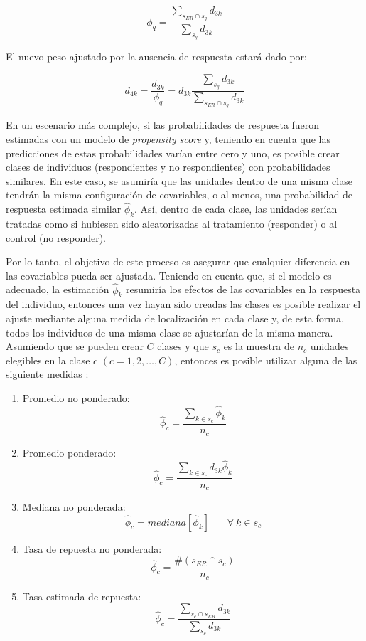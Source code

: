 \documentclass[
  12pt,
  spanish,
]{book}
\begin{document}
\[
\phi_{q} = \frac{\sum_{s_{ER}\cap s_q}d_{3k}}{\sum_{s_{q}}d_{3k}}
\]

El nuevo peso ajustado por la ausencia de respuesta estará dado por:

\[
d_{4k} = \frac{d_{3k}}{\phi_{q}} 
= d_{3k}\frac{\sum_{s_q}d_{3k}}{\sum_{s_{ER}\cap s_q}d_{3k}}
\]

En un escenario más complejo, si las probabilidades de respuesta fueron estimadas con un modelo de \emph{propensity score} y, teniendo en cuenta que las predicciones de estas probabilidades varían entre cero y uno, es posible crear clases de individuos (respondientes y no respondientes) con probabilidades similares. En este caso, se asumiría que las unidades dentro de una misma clase tendrán la misma configuración de covariables, o al menos, una probabilidad de respuesta estimada similar \(\hat\phi_k\). Así, dentro de cada clase, las unidades serían tratadas como si hubiesen sido aleatorizadas al tratamiento (responder) o al control (no responder).

Por lo tanto, el objetivo de este proceso es asegurar que cualquier diferencia en las covariables pueda ser ajustada. Teniendo en cuenta que, si el modelo es adecuado, la estimación \(\hat\phi_k\) resumiría los efectos de las covariables en la respuesta del individuo, entonces una vez hayan sido creadas las clases es posible realizar el ajuste mediante alguna medida de localización en cada clase y, de esta forma, todos los individuos de una misma clase se ajustarían de la misma manera. Asumiendo que se pueden crear \(C\) clases y que \(s_c\) es la muestra de \(n_c\) unidades elegibles en la clase \(c\) \((c=1, 2, \ldots, C)\), entonces es posible utilizar alguna de las siguiente medidas \citep{Valliant_Dever_2017}:

\begin{enumerate}
\def\labelenumi{\arabic{enumi}.}
\item
  Promedio no ponderado:
  \[\hat{\phi}_c = \frac{\sum_{k \in s_c}\hat{\phi}_k}{n_c}\]
\item
  Promedio ponderado:
  \[\hat{\phi}_c = \frac{\sum_{k \in s_c}d_{3k}\hat{\phi}_k}{n_c}\]
\item
  Mediana no ponderada:
  \[\hat{\phi}_c = mediana[\hat{\phi}_k]  \ \ \ \ \ \ \ \ \forall \ k  \in s_c\]
\item
  Tasa de repuesta no ponderada:
  \[\hat{\phi}_c = \frac{\#(s_{ER}\cap s_c)}{n_c}\]
\item
  Tasa estimada de repuesta:
  \[\hat{\phi}_c = \frac{\sum_{s_c \cap s_{ER}}d_{3k}}{\sum_{s_c}d_{3k}}\]
\end{enumerate}
\end{document}
